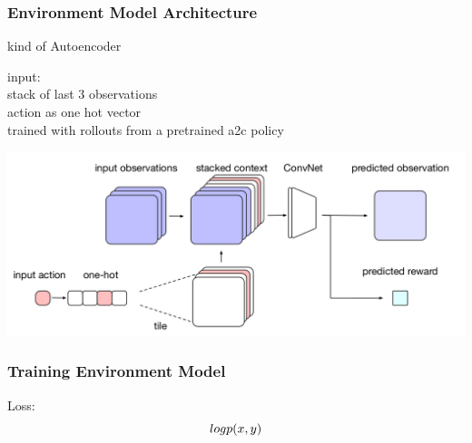 \begin{frame}
    \frametitle{Environment Model Architecture}

\begin{multicols}{2}
	\begin{PraesentationAufzaehlung}
		\item kind of Autoencoder
		\item input:\\
		stack of last 3 observations\\
		action as one hot vector\\
		trained with rollouts from a pretrained a2c policy
	\end{PraesentationAufzaehlung}
    \vfill\columnbreak
	\begin{center}
    \includegraphics[width=\columnwidth]{./Images/environment_model_architecture.png}%
	\end{center}
\end{multicols}
    
\end{frame}
\clearpage




\begin{frame}
    \frametitle{Training Environment Model}

\begin{PraesentationAufzaehlung}
	\item Loss:\\
	\begin{equation}
	\mathnormal{
	log p(x, y) }
	\end{equation}
\end{PraesentationAufzaehlung}
    
\end{frame}
\clearpage


